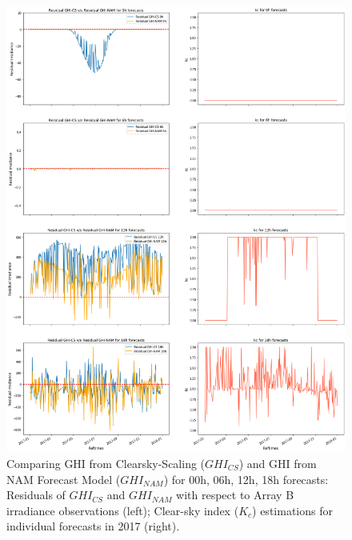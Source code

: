 \begin{figure}[htbp]
    \begin{center}
    	\includegraphics[width=\textwidth]{chapter4/fig_ghi_comparison_cs.png}
    	\caption[Comparing GHI from Clearsky-Scaling ($GHI_{CS}$) and GHI from NAM Forecast Model ($GHI_{NAM}$) for 00h, 06h, 12h, 18h forecasts in 2017]{Comparing GHI from Clearsky-Scaling ($GHI_{CS}$) and GHI from NAM Forecast Model ($GHI_{NAM}$) for 00h, 06h, 12h, 18h forecasts: Residuals of $GHI_{CS}$ and $GHI_{NAM}$ with respect to Array B irradiance observations (left); Clear-sky index ($K_c$) estimations for individual forecasts in 2017 (right).}
    	\label{fig:fig_ghi_comparison_cs}
    \end{center}
\end{figure}

